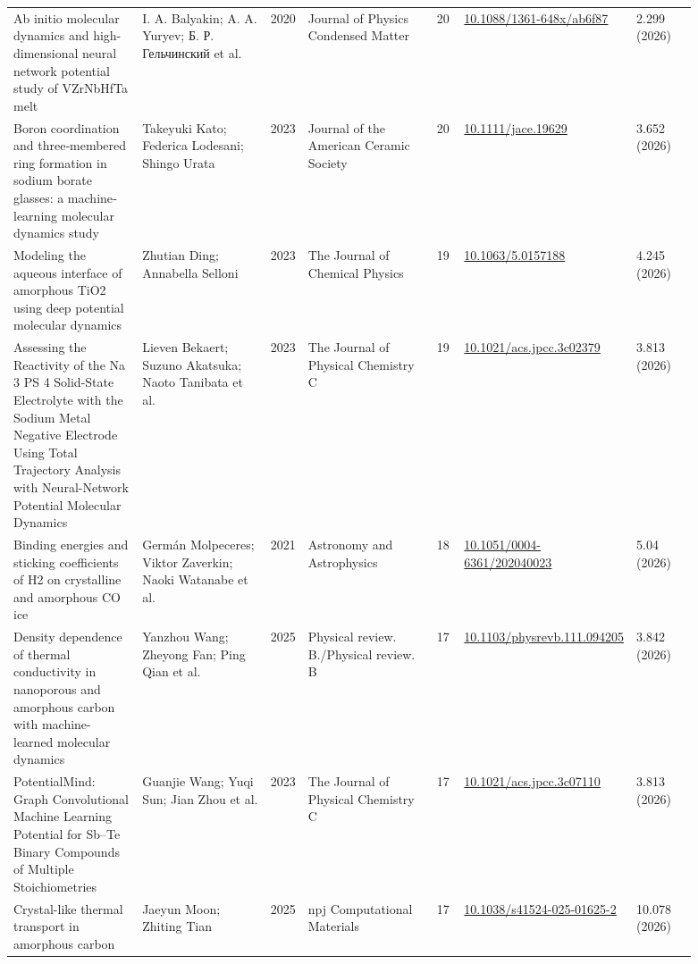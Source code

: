 \documentclass[10pt,a4paper]{article}
\begin{document}
{\begin{longtable}{p{0.192\linewidth}p{0.192\linewidth}p{0.043\linewidth}p{0.192\linewidth}p{0.043\linewidth}p{0.132\linewidth}p{0.096\linewidth}}
Ab initio molecular dynamics and high-dimensional neural network potential study of VZrNbHfTa melt & I. A. Balyakin; A. A. Yuryev; Б. Р. Гельчинский et al. & 2020 & Journal of Physics Condensed Matter & 20 & \href{https://doi.org/10.1088/1361-648x/ab6f87}{10.1088/1361-648x/ab6f87} & 2.299 (2026) \\
Boron coordination and three‐membered ring formation in sodium borate glasses: a machine‐learning molecular dynamics study & Takeyuki Kato; Federica Lodesani; Shingo Urata & 2023 & Journal of the American Ceramic Society & 20 & \href{https://doi.org/10.1111/jace.19629}{10.1111/jace.19629} & 3.652 (2026) \\
Modeling the aqueous interface of amorphous TiO2 using deep potential molecular dynamics & Zhutian Ding; Annabella Selloni & 2023 & The Journal of Chemical Physics & 19 & \href{https://doi.org/10.1063/5.0157188}{10.1063/5.0157188} & 4.245 (2026) \\
Assessing the Reactivity of the Na 3 PS 4 Solid-State Electrolyte with the Sodium Metal Negative Electrode Using Total Trajectory Analysis with Neural-Network Potential Molecular Dynamics & Lieven Bekaert; Suzuno Akatsuka; Naoto Tanibata et al. & 2023 & The Journal of Physical Chemistry C & 19 & \href{https://doi.org/10.1021/acs.jpcc.3c02379}{10.1021/acs.jpcc.3c02379} & 3.813 (2026) \\
Binding energies and sticking coefficients of H2 on crystalline and amorphous CO ice & Germán Molpeceres; Viktor Zaverkin; Naoki Watanabe et al. & 2021 & Astronomy and Astrophysics & 18 & \href{https://doi.org/10.1051/0004-6361/202040023}{10.1051/0004-6361/202040023} & 5.04 (2026) \\
Density dependence of thermal conductivity in nanoporous and amorphous carbon with machine-learned molecular dynamics & Yanzhou Wang; Zheyong Fan; Ping Qian et al. & 2025 & Physical review. B./Physical review. B & 17 & \href{https://doi.org/10.1103/physrevb.111.094205}{10.1103/physrevb.111.094205} & 3.842 (2026) \\
PotentialMind: Graph Convolutional Machine Learning Potential for Sb–Te Binary Compounds of Multiple Stoichiometries & Guanjie Wang; Yuqi Sun; Jian Zhou et al. & 2023 & The Journal of Physical Chemistry C & 17 & \href{https://doi.org/10.1021/acs.jpcc.3c07110}{10.1021/acs.jpcc.3c07110} & 3.813 (2026) \\
Crystal-like thermal transport in amorphous carbon & Jaeyun Moon; Zhiting Tian & 2025 & npj Computational Materials & 17 & \href{https://doi.org/10.1038/s41524-025-01625-2}{10.1038/s41524-025-01625-2} & 10.078 (2026) \\

\end{longtable}}
\end{document}
